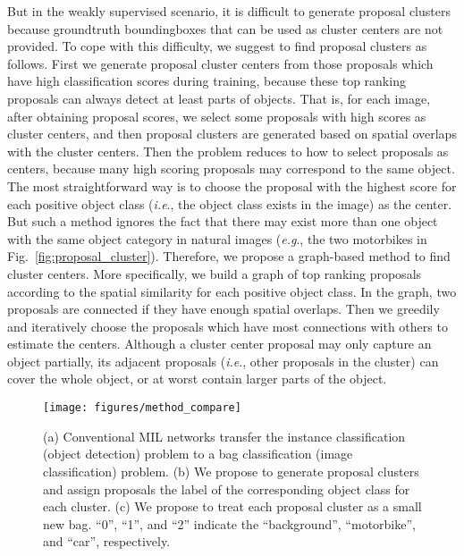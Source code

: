 \documentclass[10pt,journal,compsoc]{IEEEtran}
\def\eg{\emph{e.g}.} \def\Eg{\emph{E.g}.}
\def\ie{\emph{i.e}.} \def\Ie{\emph{I.e}.}
\begin{document}
But in the weakly supervised scenario,
it is difficult to generate proposal clusters
because groundtruth boundingboxes that can be used as cluster centers are not provided.
To cope with this difficulty, we suggest to find proposal clusters as follows.
First we generate proposal cluster centers
from those proposals which have high classification scores during training,
because these top ranking proposals can always detect at least parts of objects.
That is, for each image, after obtaining proposal scores, we select some proposals with high scores as cluster centers,
and then proposal clusters are generated based on spatial overlaps with the cluster centers.
Then the problem reduces to how to select proposals as centers,
because many high scoring proposals may correspond to the same object.
The most straightforward way is to choose the proposal with the highest score for each positive object class (\ie, the object class exists in the image) as the center.
But such a method ignores the fact that there may exist more than one object with the same object category in natural images (\eg, the two motorbikes in Fig.~\ref{fig:proposal_cluster}).
Therefore, we propose a graph-based method to find cluster centers.
More specifically, we build a graph of top ranking proposals according to the spatial similarity for each positive object class.
In the graph, two proposals are connected if they have enough spatial overlaps.
Then we greedily and iteratively choose the proposals which have most connections with others to estimate the centers.
Although a cluster center proposal may only capture an object partially,
its adjacent proposals (\ie, other proposals in the cluster) can cover the whole object,
or at worst contain larger parts of the object.


\begin{figure}[t]
\begin{center}
   \texttt{[image: figures/method\_compare]}
\end{center}
   \caption{(a) Conventional MIL networks transfer the instance classification (object detection) problem to a bag classification (image classification) problem.
   (b) We propose to generate proposal clusters and assign proposals the label of the corresponding object class for each cluster.
   (c) We propose to treat each proposal cluster as a small new bag.
   ``0'', ``1'', and ``2'' indicate the ``background'', ``motorbike'', and ``car'', respectively.
   }
\label{fig:method_compare}
\end{figure}
\end{document}
